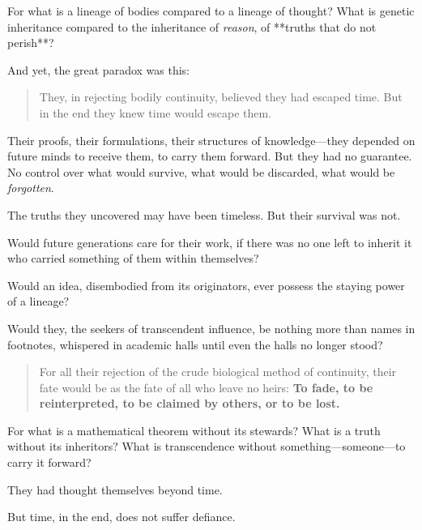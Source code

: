 For what is a lineage of bodies compared to a lineage of thought? What is genetic inheritance compared to the inheritance of \textit{reason}, of **truths that do not perish**?

\bigskip

And yet, the great paradox was this:

\begin{quote}
They, in rejecting bodily continuity, believed they had escaped time.  But in the end they knew time would escape them.  
\end{quote}

\bigskip

Their proofs, their formulations, their structures of knowledge—they depended on future minds to receive them, to carry them forward. But they had no guarantee. No control over what would survive, what would be discarded, what would be \textit{forgotten}. 

The truths they uncovered may have been timeless. But their survival was not.

\bigskip

Would future generations care for their work, if there was no one left to inherit it who carried something of them within themselves? 

Would an idea, disembodied from its originators, ever possess the staying power of a lineage?

Would they, the seekers of transcendent influence, be nothing more than names in footnotes, whispered in academic halls until even the halls no longer stood?

\bigskip

\begin{quote}
For all their rejection of the crude biological method of continuity,  
their fate would be as the fate of all who leave no heirs:  
\textbf{To fade, to be reinterpreted, to be claimed by others, or to be lost.}
\end{quote}

\bigskip

For what is a mathematical theorem without its stewards? What is a truth without its inheritors? What is transcendence without something—someone—to carry it forward?

They had thought themselves beyond time.

But time, in the end, does not suffer defiance.
